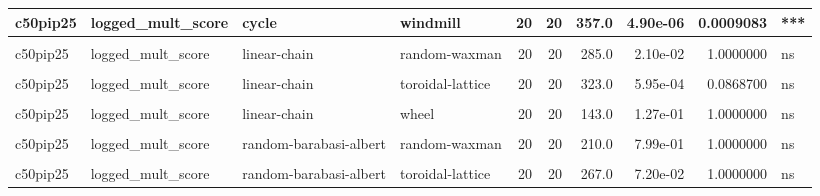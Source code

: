 \documentclass[
]{book}
\begin{document}
\begin{table}
\begin{tabular}{l|l|l|l|r|r|r|r|r|l}
\hline
c50pip25 & logged\_mult\_score & cycle & windmill & 20 & 20 & 357.0 & 4.90e-06 & 0.0009083 & ***\\
\hline
\cellcolor{gray!6}{c50pip25} & \cellcolor{gray!6}{logged\_mult\_score} & \cellcolor{gray!6}{linear-chain} & \cellcolor{gray!6}{random-barabasi-albert} & \cellcolor{gray!6}{20} & \cellcolor{gray!6}{20} & \cellcolor{gray!6}{256.0} & \cellcolor{gray!6}{1.34e-01} & \cellcolor{gray!6}{1.0000000} & \cellcolor{gray!6}{ns}\\
\hline
c50pip25 & logged\_mult\_score & linear-chain & random-waxman & 20 & 20 & 285.0 & 2.10e-02 & 1.0000000 & ns\\
\hline
\cellcolor{gray!6}{c50pip25} & \cellcolor{gray!6}{logged\_mult\_score} & \cellcolor{gray!6}{linear-chain} & \cellcolor{gray!6}{star} & \cellcolor{gray!6}{20} & \cellcolor{gray!6}{20} & \cellcolor{gray!6}{0.0} & \cellcolor{gray!6}{0.00e+00} & \cellcolor{gray!6}{0.0000000} & \cellcolor{gray!6}{****}\\
\hline
c50pip25 & logged\_mult\_score & linear-chain & toroidal-lattice & 20 & 20 & 323.0 & 5.95e-04 & 0.0868700 & ns\\
\hline
\cellcolor{gray!6}{c50pip25} & \cellcolor{gray!6}{logged\_mult\_score} & \cellcolor{gray!6}{linear-chain} & \cellcolor{gray!6}{well-mixed} & \cellcolor{gray!6}{20} & \cellcolor{gray!6}{20} & \cellcolor{gray!6}{363.0} & \cellcolor{gray!6}{1.70e-06} & \cellcolor{gray!6}{0.0003317} & \cellcolor{gray!6}{***}\\
\hline
c50pip25 & logged\_mult\_score & linear-chain & wheel & 20 & 20 & 143.0 & 1.27e-01 & 1.0000000 & ns\\
\hline
\cellcolor{gray!6}{c50pip25} & \cellcolor{gray!6}{logged\_mult\_score} & \cellcolor{gray!6}{linear-chain} & \cellcolor{gray!6}{windmill} & \cellcolor{gray!6}{20} & \cellcolor{gray!6}{20} & \cellcolor{gray!6}{337.0} & \cellcolor{gray!6}{1.04e-04} & \cellcolor{gray!6}{0.0161200} & \cellcolor{gray!6}{*}\\
\hline
c50pip25 & logged\_mult\_score & random-barabasi-albert & random-waxman & 20 & 20 & 210.0 & 7.99e-01 & 1.0000000 & ns\\
\hline
\cellcolor{gray!6}{c50pip25} & \cellcolor{gray!6}{logged\_mult\_score} & \cellcolor{gray!6}{random-barabasi-albert} & \cellcolor{gray!6}{star} & \cellcolor{gray!6}{20} & \cellcolor{gray!6}{20} & \cellcolor{gray!6}{0.0} & \cellcolor{gray!6}{0.00e+00} & \cellcolor{gray!6}{0.0000000} & \cellcolor{gray!6}{****}\\
\hline
c50pip25 & logged\_mult\_score & random-barabasi-albert & toroidal-lattice & 20 & 20 & 267.0 & 7.20e-02 & 1.0000000 & ns\\

\end{tabular}
\end{table}
\end{document}
